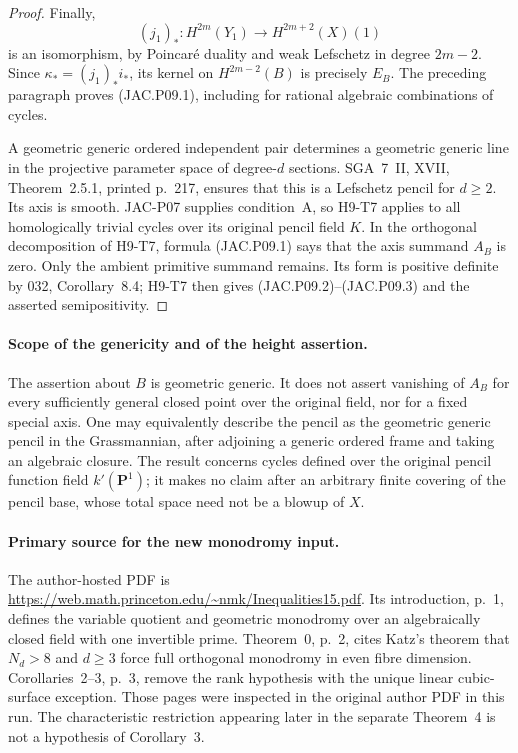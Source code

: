 \begin{proof}
Finally,
\[
 (j_1)_*:H^{2m}(Y_1)\longrightarrow H^{2m+2}(X)(1)
\]
is an isomorphism, by Poincar\'e duality and weak Lefschetz in degree
$2m-2$. Since $\kappa_*=(j_1)_*i_*$, its kernel on
$H^{2m-2}(B)$ is precisely $E_B$. The preceding paragraph proves
(JAC.P09.1), including for rational algebraic combinations of cycles.

A geometric generic ordered independent pair determines a geometric
generic line in the projective parameter space of degree-$d$
sections. SGA~7~II, XVII, Theorem~2.5.1, printed p.~217, ensures
that this is a Lefschetz pencil for $d\ge2$. Its axis is smooth.
JAC-P07 supplies condition~A, so H9-T7 applies to all homologically
trivial cycles over its original pencil field $K$. In the
orthogonal decomposition of H9-T7, formula (JAC.P09.1) says that
the axis summand $A_B$ is zero. Only the ambient primitive summand
remains. Its form is positive definite by 032, Corollary~8.4;
H9-T7 then gives (JAC.P09.2)--(JAC.P09.3) and the asserted
semipositivity.
\end{proof}

\paragraph{Scope of the genericity and of the height assertion.}
The assertion about $B$ is geometric generic. It does not assert
vanishing of $A_B$ for every sufficiently general closed point over
the original field, nor for a fixed special axis. One may equivalently
describe the pencil as the geometric generic pencil in the
Grassmannian, after adjoining a generic ordered frame and taking an
algebraic closure. The result concerns cycles defined over the
original pencil function field $k'(\mathbf P^1)$; it makes no claim
after an arbitrary finite covering of the pencil base, whose total
space need not be a blowup of $X$.

\paragraph{Primary source for the new monodromy input.}
The author-hosted PDF is
\url{https://web.math.princeton.edu/~nmk/Inequalities15.pdf}.
Its introduction, p.~1, defines the variable quotient and geometric
monodromy over an algebraically closed field with one invertible
prime. Theorem~0, p.~2, cites Katz's theorem that $N_d>8$ and
$d\ge3$ force full orthogonal monodromy in even fibre dimension.
Corollaries~2--3, p.~3, remove the rank hypothesis with the unique
linear cubic-surface exception. Those pages were inspected in the
original author PDF in this run. The characteristic restriction
appearing later in the separate Theorem~4 is not a hypothesis of
Corollary~3.
